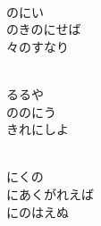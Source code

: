 \documentclass[10pt,b5j]{tarticle} %
\begin{document}
\vspace{1.5em} %
\newcommand{\linespace}{0.5em} %
\newcommand{\blocksize}{0.5\hsize} %
\newcommand{\itemmargin}{3em} %
\begin{enumerate} %
    \setlength{\itemindent}{\itemmargin} %
    \begin{minipage}[c]{\blocksize}
    
        \vspace{\linespace}
        \item~\\
        のにい\\
        のきのにせば\\
        々のすなり
        
    \end{minipage}
    \begin{minipage}[c]{\blocksize}
        
        \vspace{\linespace}
        \item~\\
        るるや\\
        ののにう\\
        きれにしよ
        
    \end{minipage}
    \begin{minipage}[c]{\blocksize}
        
        \vspace{\linespace}
        \item~\\
        にくの\\
        にあくがれえば\\
        にのはえぬ
        
    \end{minipage}
    \begin{minipage}[c]{\blocksize}
        

\end{minipage}
\end{enumerate}
\end{document}
